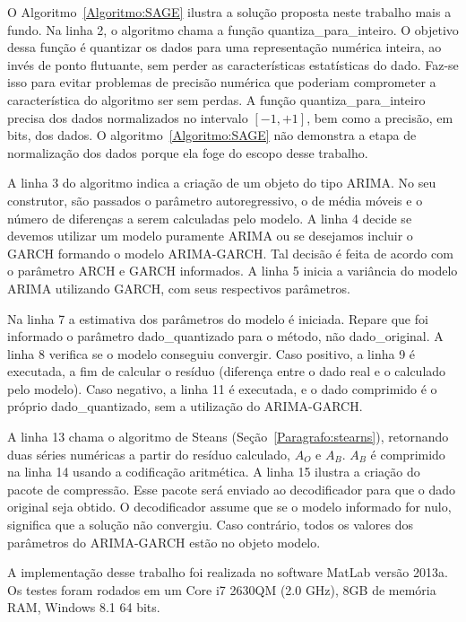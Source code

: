 O Algoritmo~\ref{Algoritmo:SAGE} ilustra a solução proposta neste trabalho mais
a fundo. Na linha 2, o algoritmo chama a função quantiza\_para\_inteiro. O objetivo dessa função
é quantizar os dados para uma representação numérica inteira, ao invés de ponto
flutuante, sem perder as características estatísticas do dado. Faz-se isso para
evitar problemas de precisão numérica que poderiam comprometer a característica do algoritmo ser sem perdas. A função quantiza\_para\_inteiro
precisa dos dados normalizados no intervalo $[-1, +1]$, bem como a precisão, em
bits, dos dados. O algoritmo~\ref{Algoritmo:SAGE} não demonstra a etapa de
normalização dos dados porque ela foge do escopo desse trabalho.

A linha 3 do algoritmo indica a criação de um objeto do tipo ARIMA. No seu
construtor, são passados o parâmetro autoregressivo, o de média móveis e o
número de diferenças a serem calculadas pelo modelo. A linha 4 decide se devemos
utilizar um modelo puramente ARIMA ou se desejamos incluir o GARCH formando o
modelo ARIMA-GARCH. Tal decisão é feita de acordo com o parâmetro ARCH e GARCH
informados. A linha 5 inicia a variância do modelo ARIMA utilizando GARCH, com
seus respectivos parâmetros.

Na linha 7 a estimativa dos parâmetros do modelo é iniciada. Repare que foi
informado o parâmetro dado\_quantizado para o método, não dado\_original. A
linha 8 verifica se o modelo conseguiu convergir. Caso positivo, a linha 9 é
executada, a fim de calcular o resíduo (diferença entre o dado real e o
calculado pelo modelo). Caso negativo, a linha 11 é executada, e o dado
comprimido é o próprio dado\_quantizado, sem a utilização do ARIMA-GARCH.

A linha 13 chama o algoritmo de Steans (Seção~\ref{Paragrafo:stearns}),
retornando duas séries numéricas a partir do resíduo calculado, $A_O$ e $A_B$.
$A_B$ é comprimido na linha 14 usando a codificação aritmética. A linha 15
ilustra a criação do pacote de compressão. Esse pacote será enviado ao
decodificador para que o dado original seja obtido. O decodificador assume que
se o modelo informado for nulo, significa que a solução não convergiu. Caso
contrário, todos os valores dos parâmetros do ARIMA-GARCH estão no objeto
modelo.

A implementação desse trabalho foi realizada no software MatLab versão 2013a. Os
testes foram rodados em um Core i7 2630QM (2.0 GHz), 8GB de memória RAM, Windows
8.1 64 bits.
